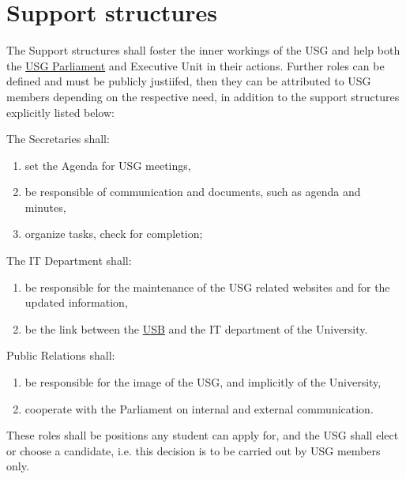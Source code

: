 \section{Support structures} 
\label{suppstrucdef}
The Support structures shall foster the inner workings of the USG and help both the \hyperref[USGParliamentDef]{USG Parliament} and Executive Unit in their actions. Further roles can be defined and must be publicly justiifed, then they can be attributed to USG members depending on the respective need, in addition to the support structures explicitly listed below:
\begin{parenum}
\item The Secretaries shall:
\begin{enumerate}
\item set the Agenda for USG meetings,
\item be responsible of communication and documents, such as agenda and minutes,
\item organize tasks, check for completion;
\end{enumerate}

\item The IT Department shall:
\begin{enumerate}
\item be responsible for the maintenance of the USG related websites and for the updated information,
\item be the link between the \hyperref[studentbody]{USB} and the IT department of the University.
\end{enumerate}

\item Public Relations  shall:
\begin{enumerate}
    \item be responsible for the image of the USG, and implicitly of the University, 
    \item cooperate with the Parliament on internal and external communication.
\end{enumerate}

\end{parenum}
These roles shall be positions any student can apply for, and the USG shall elect or choose a candidate, i.e. this decision is to be carried out by USG members only.